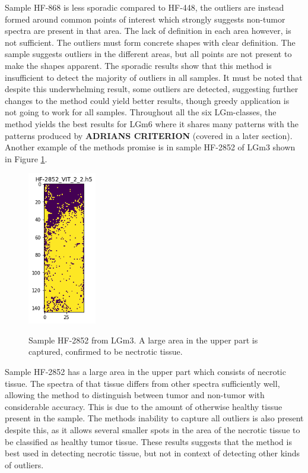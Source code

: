 Sample HF-868 is less sporadic compared to HF-448, the outliers are instead formed around common points of interest which strongly suggests non-tumor spectra are present in that area. The lack of definition in each area however, is not sufficient. The outliers must form concrete shapes with clear definition. The sample suggests outliers in the different areas, but all points are not present to make the shapes apparent. 
The sporadic results show that this method is insufficient to detect the majority of outliers in all samples. It must be noted that despite this underwhelming result, some outliers are detected, suggesting further changes to the method could yield better results, though greedy application is not going to work for all samples. Throughout all the six LGm-classes, the method yields the best results for LGm6 where it shares many patterns with the patterns produced by \textbf{ADRIANS CRITERION} (covered in a later section). Another example of the methods promise is in sample HF-2852 of LGm3 shown in Figure \ref{fig:stdHF2852}.

\begin{figure}[H]
	\centering
{\includegraphics[width=3cm]{images/STDtest/LGm-3/HF-2852_VIT_2_2.h5_6.png} }
\caption{Sample HF-2852 from LGm3. A large area in the upper part is captured, confirmed to be nectrotic tissue.
\label{fig:stdHF2852}}

\end{figure}

Sample HF-2852 has a large area in the upper part which consists of necrotic tissue. The spectra of that tissue differs from other spectra sufficiently well, allowing the method to distinguish between tumor and non-tumor with considerable accuracy. This is due to the amount of otherwise healthy tissue present in the sample. The methods inability to capture all outliers is also present despite this, as it allows several smaller spots in the area of the necrotic tissue to be classified as healthy tumor tissue. These results suggests that the method is best used in detecting necrotic tissue, but not in context of detecting other kinds of outliers.

